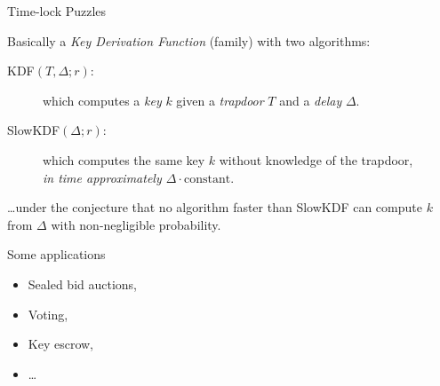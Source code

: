 \documentclass[aspectratio=169]{beamer}
\begin{document}

\begin{frame}{Time-lock Puzzles}
  \begin{center}
  \end{center}

  Basically a \emph{Key Derivation Function} (family) with two
  algorithms: \medskip
  \begin{description}
  \item[KDF$(T, \Delta; r)$:] which computes a \emph{key} $k$
    given a \emph{trapdoor} $T$ and a \emph{delay} $\Delta$.
  \item[SlowKDF$(\Delta; r)$:] which computes the same key $k$
    without knowledge of the trapdoor,\\
    \emph{in time approximately $\Delta\cdot\mathrm{constant}$}.
  \end{description}
  \smallskip \dots under the conjecture that no algorithm faster than
  SlowKDF can compute $k$ from $\Delta$ with non-negligible
  probability.
\end{frame}


\begin{frame}{Some applications}
  \large
  \begin{itemize}
    \setlength{\itemsep}{1.5em}
  \item Sealed bid auctions,
  \item Voting,
  \item Key escrow,
  \item \dots
  \end{itemize}
\end{frame}

\end{document}
